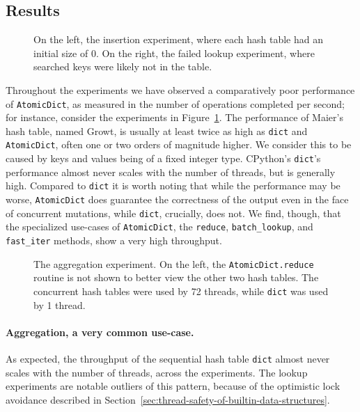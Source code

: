 \subsection{Results}\label{subsec:comparisons-results}

\begin{figure}
    \begin{centering}
        \scalebox{0.4}{}%
        \scalebox{0.4}{}
        \caption{On the left, the insertion experiment, where each hash table had an initial size of 0. On the right, the failed lookup experiment, where searched keys were likely not in the table.}
        \label{fig:bad}
    \end{centering}
\end{figure}

Throughout the experiments we have observed a comparatively poor performance of \texttt{AtomicDict}, as measured in the number of operations completed per second; for instance, consider the experiments in Figure~\ref{fig:bad}.
The performance of Maier's hash table, named Growt, is usually at least twice as high as \texttt{dict} and \texttt{AtomicDict}, often one or two orders of magnitude higher.
We consider this to be caused by keys and values being of a fixed integer type.
CPython's \texttt{dict}'s performance almost never scales with the number of threads, but is generally high.
Compared to \texttt{dict} it is worth noting that while the performance may be worse, \texttt{AtomicDict} does guarantee the correctness of the output even in the face of concurrent mutations, while \texttt{dict}, crucially, does not.
We find, though, that the specialized use-cases of \texttt{AtomicDict}, the \texttt{reduce}, \texttt{{batch\_lookup}}, and \texttt{fast\_iter} methods, show a very high throughput.

\begin{figure}
    \begin{centering}
        \scalebox{0.4}{}%
        \scalebox{0.4}{}
        \caption{The aggregation experiment. On the left, the \texttt{AtomicDict.reduce} routine is not shown to better view the other two hash tables. The concurrent hash tables were used by 72 threads, while \texttt{dict} was used by 1 thread.}
        \label{fig:aggregation}
    \end{centering}
\end{figure}

\paragraph{Aggregation, a very common use-case.} As expected, the throughput of the sequential hash table \texttt{dict} almost never scales with the number of threads, across the experiments.
The lookup experiments are notable outliers of this pattern, because of the optimistic lock avoidance described in Section~\ref{sec:thread-safety-of-builtin-data-structures}.

